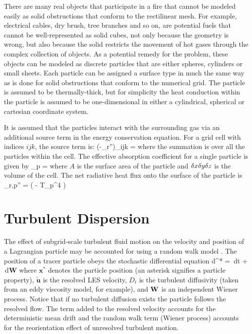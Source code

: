 There are many real objects that participate in a fire that cannot be modeled easily as solid obstructions that conform
to the rectilinear mesh. For example, electrical cables, dry brush, tree branches and so on, are potential fuels that cannot
be well-represented as solid cubes, not only because the geometry is wrong, but also because the solid restricts the
movement of hot gases through the complex collection of objects. As a potential remedy for the problem, these objects can
be modeled as discrete particles that are either spheres, cylinders or small sheets. Each particle can be assigned a surface
type in much the same way as is done for solid obstructions that conform to the numerical grid. The particle is assumed to be
thermally-thick, but for simplicity the heat conduction within the particle is assumed to be one-dimensional in either
a cylindrical, spherical or cartesian coordinate system.

It is assumed that the particles interact with the surrounding gas via an additional source term in the energy conservation
equation. For a grid cell with indices $ijk$, the source term is:
\be (-\nabla\!\cdot \dot{\bq}_r'')_{ijk} = \sum {} \ee
where the summation is over all the particles within the cell. The effective absorption coefficient for a single particle is given by
\be \kappa_p =  \ee
where $A$ is the surface area of the particle and $\delta x \delta y \delta z$ is the volume of the cell.
The net radiative heat flux onto the surface of the particle is
\be \dq_{r,p}'' = \epsilon \left(  - \sigma T_p^4 \right) \ee


\clearpage

\section{Turbulent Dispersion}

The effect of subgrid-scale turbulent fluid motion on the velocity and position of a Lagrangian particle may be accounted for using a random walk model \cite{Raman:CF}.  The position of a tracer particle obeys the stochastic differential equation
\be
\mbox{d}^* =  \,\mbox{d}t +  \,\mbox{d}\mbox{\textbf{W}}
\ee
where $\mathbf{x}^*$ denotes the particle position (an asterisk signifies a particle property), $\tilde{\mathbf{u}}$ is the resolved LES velocity, $D_t$ is the turbulent diffusivity (taken from an eddy viscosity model, for example), and $\mbox{\textbf{W}}$ is an independent Wiener process.  Notice that if no turbulent diffusion exists the particle follows the resolved flow.  The term added to the resolved velocity accounts for the deterministic mean drift and the random walk term (Wiener process) accounts for the reorientation effect of unresolved turbulent motion.

